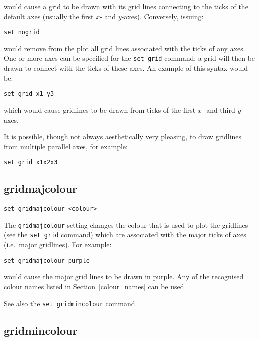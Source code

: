\noindent would cause a grid to be drawn with its grid lines connecting to the ticks of
the default axes (usually the first $x$- and $y$-axes).  Conversely, issuing:

\begin{verbatim}
set nogrid
\end{verbatim}

\noindent would remove from the plot all grid lines associated with the ticks of any axes.
One or more axes can be specified for the {\tt set grid} command; a grid will
then be drawn to connect with the ticks of these axes. An example of this syntax
would be:

\begin{verbatim}
set grid x1 y3
\end{verbatim}

\noindent which would cause gridlines to be drawn from ticks of the first $x$- and third
$y$-axes.

It is possible, though not always aesthetically very pleasing, to draw
gridlines from multiple parallel axes, for example:

\begin{verbatim}
set grid x1x2x3
\end{verbatim}


\subsection{gridmajcolour}

\begin{verbatim}
set gridmajcolour <colour>
\end{verbatim}

The {\tt gridmajcolour} setting changes the colour that is used to plot the
gridlines (see the {\tt set grid} command) which are associated with the major
ticks of axes (i.e.\ major gridlines). For example:

\begin{verbatim}
set gridmajcolour purple
\end{verbatim}

\noindent would cause the major grid lines to be drawn in purple. Any of the recognised
colour names listed in Section~\ref{colour_names} can be used.

See also the {\tt set gridmincolour} command.


\subsection{gridmincolour}

